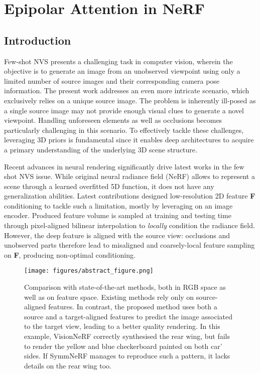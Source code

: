 \chapter{Epipolar Attention in NeRF}
\label{chapter:epinerf}





\section{Introduction}


Few-shot NVS presents a challenging task in computer vision, wherein the objective is to generate an image from an unobserved viewpoint using only a limited number of source images and their corresponding camera pose information. The present work addresses an even more intricate scenario, which exclusively relies on a unique source image. The problem is inherently ill-posed as a single source image may not provide enough visual clues to generate a novel viewpoint. Handling unforeseen elements as well as occlusions becomes particularly challenging in this scenario. To effectively tackle these challenges, leveraging 3D priors \cite{saito2019pifu,johari2022geonerf} is fundamental since it enables deep architectures to acquire a primary understanding of the underlying 3D scene structure. 

Recent advances in neural rendering \cite{tewari2022advances} significantly drive latest works in the few shot NVS issue. While original neural radiance field (NeRF) \cite{mildenhall2020nerf} allows to represent a scene through a learned overfitted 5D function, it does not have any generalization abilities. Latest contributions \cite{pixelnerf,symmnerf,visionnerf} designed low-resolution 2D feature \textbf{F} conditioning to tackle such a limitation, mostly by leveraging on an image encoder. Produced feature volume is sampled at training and testing time through pixel-aligned bilinear interpolation to \textit{locally} condition the radiance field. However, the deep feature is aligned with the source view: occlusions and unobserved parts therefore lead to misaligned and coarsely-local feature sampling on \textbf{F}, producing non-optimal conditioning. 

\begin{figure}[htp!]
    \center
  \texttt{[image: figures/abstract\_figure.png]}
  \caption{Comparison with state-of-the-art methods, both in RGB space as well as on feature space. Existing methods rely only on source-aligned features. In contrast, the proposed method uses both a source and a target-aligned features to predict the image associated to the target view, leading to a better quality rendering. In this example, VisionNeRF \cite{visionnerf} correctly synthesised the rear wing, but fails to render the yellow and blue checkerboard painted on both car' sides. If SymmNeRF \cite{symmnerf} manages to reproduce such a pattern, it lacks details on the rear wing too.}
  \label{fig:res_car_intro}
\end{figure}

